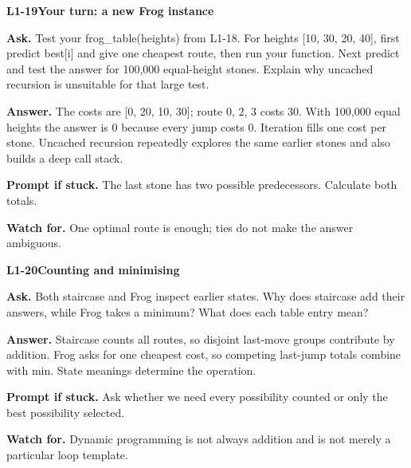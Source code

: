 \documentclass[11pt,a4paper]{article}
\begin{document}
\noindent\begin{minipage}{\textwidth}
{\color{teal}\textbf{L1-19}}\quad \textbf{Your turn: a new Frog instance}\par\smallskip
\textbf{Ask.} Test your frog\_table(heights) from L1-18. For heights [10, 30, 20, 40], first predict best[i] and give one cheapest route, then run your function. Next predict and test the answer for 100,000 equal-height stones. Explain why uncached recursion is unsuitable for that large test.\par\smallskip
\textbf{Answer.} The costs are [0, 20, 10, 30]; route 0, 2, 3 costs 30. With 100,000 equal heights the answer is 0 because every jump costs 0. Iteration fills one cost per stone. Uncached recursion repeatedly explores the same earlier stones and also builds a deep call stack.\par\smallskip
\textbf{Prompt if stuck.} The last stone has two possible predecessors. Calculate both totals.\par\smallskip
\textbf{Watch for.} One optimal route is enough; ties do not make the answer ambiguous.
\end{minipage}\par{}\medskip

\noindent\begin{minipage}{\textwidth}
{\color{teal}\textbf{L1-20}}\quad \textbf{Counting and minimising}\par\smallskip
\textbf{Ask.} Both staircase and Frog inspect earlier states. Why does staircase add their answers, while Frog takes a minimum? What does each table entry mean?\par\smallskip
\textbf{Answer.} Staircase counts all routes, so disjoint last-move groups contribute by addition. Frog asks for one cheapest cost, so competing last-jump totals combine with min. State meanings determine the operation.\par\smallskip
\textbf{Prompt if stuck.} Ask whether we need every possibility counted or only the best possibility selected.\par\smallskip
\textbf{Watch for.} Dynamic programming is not always addition and is not merely a particular loop template.
\end{minipage}\par{}\medskip
\end{document}
